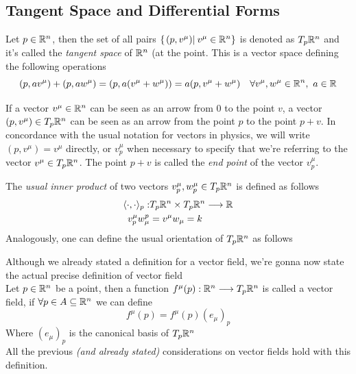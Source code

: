 \documentclass[../complete.tex]{subfiles}
\begin{document}
\subsection{Tangent Space and Differential Forms}
\begin{dfn}
	Let $p\in\mathbb{R}^n$, then the set of all pairs $\{\left.(p,v^\mu)\right|_{}v^\mu\in\mathbb{R}^n\}$ is denoted as $T_{p}\mathbb{R}^n$ and it's called the \textit{tangent space} of $\mathbb{R}^n$ (at the point. This is a vector space defining the following operations
	\begin{equation*}
		(p,av^\mu)+(p,aw^\mu)=\left(p,a(v^\mu+w^\mu)\right)=a(p,v^\mu+w^\mu)\quad\forall v^\mu,w^\mu\in\mathbb{R}^n,\ a\in\mathbb{R}
	\end{equation*}
\end{dfn}
\begin{rmk}
	If a vector $v^\mu\in\mathbb{R}^n$ can be seen as an arrow from $0$ to the point $v$, a vector $(p,v^\mu)\in T_p\mathbb{R}^n$ can be seen as an arrow from the point $p$ to the point $p+v$. In concordance with the usual notation for vectors in physics, we will write $(p,v^\mu)=v^\mu$ directly, or $v^\mu_p$ when necessary to specify that we're referring to the vector $v^\mu\in T_p\mathbb{R}^n$. The point $p+v$ is called the \textit{end point} of the vector $v^\mu_p$.
\end{rmk}
\begin{dfn}
	The \textit{usual inner product} of two vectors $v^\mu_p,w^\mu_p\in T_p\mathbb{R}^n$ is defined as follows
	\begin{equation}
		\begin{aligned}
			\langle \cdot, \cdot \rangle_p:&T_p\mathbb{R}^n\times T_p\mathbb{R}^n\overset{}{\longrightarrow}\mathbb{R}\\
			v^\mu_pw_\mu^p&=v^\mu w_\mu=k
		\end{aligned}
		\label{eq:tanscalarprod}
	\end{equation}
	Analogously, one can define the usual orientation of $T_p\mathbb{R}^n$ as follows
	\begin{equation*}
		[(e^{\mu_1})_p,\cdots,(e^{\mu_n})_p]
	\end{equation*}
\end{dfn}
\begin{dfn}
	Although we already stated a definition for a vector field, we're gonna now state the actual precise definition of vector field\\
	Let $p\in\mathbb{R}^n$ be a point, then a function $f^\mu(p):\mathbb{R}^n\overset{}{\longrightarrow} T_p\mathbb{R}^n$ is called a vector field, if $\forall p\in A\subseteq\mathbb{R}^n$ we can define
	\begin{equation}
		f^\mu(p)=f^\mu(p)(e_\mu)_p
		\label{eq:correctvectorfield}
	\end{equation}
	Where $(e_\mu)_p$ is the canonical basis of $T_p\mathbb{R}^n$\\
	All the previous \textit{(and already stated)} considerations on vector fields hold with this definition.
\end{dfn}
\end{document}
